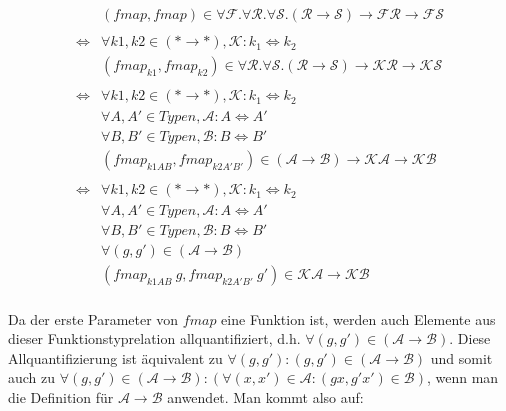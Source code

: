 \begin{align*}
&(fmap, fmap) \in \forall \mathcal{F} . \forall \mathcal{R} . \forall \mathcal{S} . (\mathcal{R} \rightarrow \mathcal{S})
\rightarrow \mathcal{F} \mathcal{R} \rightarrow \mathcal{F} \mathcal{S} \\
&\\
\Leftrightarrow &
\forall k1, k2 \in (* \rightarrow *), \mathcal{K} : k_1 \Leftrightarrow k_2 \\
&(fmap_{k1}, fmap_{k2}) \in \forall \mathcal{R} . \forall \mathcal{S} . (\mathcal{R} \rightarrow \mathcal{S}) \rightarrow
\mathcal{K} \mathcal{R} \rightarrow \mathcal{K} \mathcal{S} \\
&\\
\Leftrightarrow &
\forall k1, k2 \in (* \rightarrow *), \mathcal{K} : k_1 \Leftrightarrow k_2 \\
&\forall A, A' \in Typen, \mathcal{A} : A \Leftrightarrow A' \\
&\forall B, B' \in Typen, \mathcal{B} : B \Leftrightarrow B' \\
&(fmap_{k1 A B}, fmap_{k2 A' B'}) \in (\mathcal{A} \rightarrow \mathcal{B}) \rightarrow
\mathcal{K} \mathcal{A} \rightarrow \mathcal{K} \mathcal{B} \\
&\\
\Leftrightarrow &
\forall k1, k2 \in (* \rightarrow *), \mathcal{K} : k_1 \Leftrightarrow k_2 \\
&\forall A, A' \in Typen, \mathcal{A} : A \Leftrightarrow A' \\
&\forall B, B' \in Typen, \mathcal{B} : B \Leftrightarrow B' \\
&\forall (g, g') \in (\mathcal{A} \rightarrow \mathcal{B}) \\
&(fmap_{k1 A B}\ g, fmap_{k2 A' B'}\ g') \in \mathcal{K} \mathcal{A} \rightarrow \mathcal{K} \mathcal{B} \\
\end{align*}

Da der erste Parameter von $fmap$ eine Funktion ist, werden auch Elemente aus dieser Funktionstyprelation allquantifiziert, d.h.
$\forall (g, g') \in (\mathcal{A} \rightarrow \mathcal{B})$. Diese Allquantifizierung ist äquivalent zu
$\forall (g, g'): (g, g') \in (\mathcal{A} \rightarrow \mathcal{B})$ und somit auch zu $\forall (g, g') \in
(\mathcal{A} \rightarrow \mathcal{B}): (\forall (x, x') \in \mathcal{A}: (g x, g' x') \in \mathcal{B})$, wenn man die Definition für
$\mathcal{A} \rightarrow \mathcal{B}$ anwendet. Man kommt also auf:

